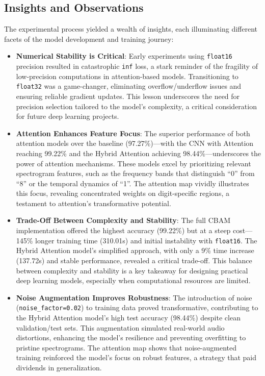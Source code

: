 \documentclass[12pt]{article}
\begin{document}
\subsection{Insights and Observations}
The experimental process yielded a wealth of insights, each illuminating different facets of the model development and training journey:
\begin{itemize}
    \item \textbf{Numerical Stability is Critical}: Early experiments using \texttt{float16} precision resulted in catastrophic \texttt{inf} loss, a stark reminder of the fragility of low-precision computations in attention-based models. Transitioning to \texttt{float32} was a game-changer, eliminating overflow/underflow issues and ensuring reliable gradient updates. This lesson underscores the need for precision selection tailored to the model's complexity, a critical consideration for future deep learning projects.
    \item \textbf{Attention Enhances Feature Focus}: The superior performance of both attention models over the baseline (97.27\%)—with the CNN with Attention reaching 99.22\% and the Hybrid Attention achieving 98.44\%—underscores the power of attention mechanisms. These models excel by prioritizing relevant spectrogram features, such as the frequency bands that distinguish ``0'' from ``8'' or the temporal dynamics of ``1''. The attention map vividly illustrates this focus, revealing concentrated weights on digit-specific regions, a testament to attention's transformative potential.
    \item \textbf{Trade-Off Between Complexity and Stability}: The full CBAM implementation offered the highest accuracy (99.22\%) but at a steep cost—145\% longer training time (310.01s) and initial instability with \texttt{float16}. The Hybrid Attention model's simplified approach, with only a 9\% time increase (137.72s) and stable performance, revealed a critical trade-off. This balance between complexity and stability is a key takeaway for designing practical deep learning models, especially when computational resources are limited.
    \item \textbf{Noise Augmentation Improves Robustness}: The introduction of noise (\texttt{noise\_factor=0.02}) to training data proved transformative, contributing to the Hybrid Attention model's high test accuracy (98.44\%) despite clean validation/test sets. This augmentation simulated real-world audio distortions, enhancing the model's resilience and preventing overfitting to pristine spectrograms. The attention map shows that noise-augmented training reinforced the model's focus on robust features, a strategy that paid dividends in generalization.

\end{itemize}
\end{document}
